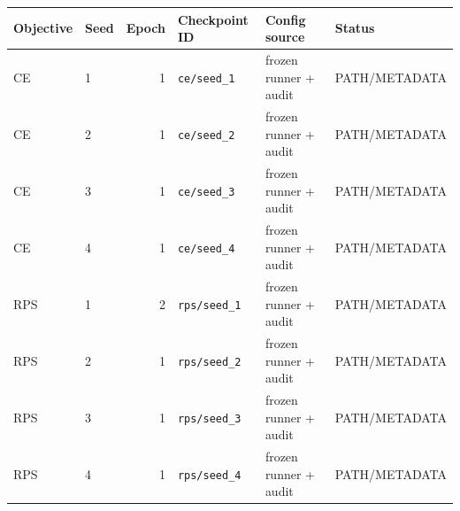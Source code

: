 \begin{center}
\footnotesize
\begin{tabular}{llrlll}
\toprule
Objective & Seed & Epoch & Checkpoint ID & Config source & Status \\
\midrule
CE & 1 & 1 & \texttt{ce/seed\_1} & frozen runner + audit & PATH/METADATA \\
CE & 2 & 1 & \texttt{ce/seed\_2} & frozen runner + audit & PATH/METADATA \\
CE & 3 & 1 & \texttt{ce/seed\_3} & frozen runner + audit & PATH/METADATA \\
CE & 4 & 1 & \texttt{ce/seed\_4} & frozen runner + audit & PATH/METADATA \\
RPS & 1 & 2 & \texttt{rps/seed\_1} & frozen runner + audit & PATH/METADATA \\
RPS & 2 & 1 & \texttt{rps/seed\_2} & frozen runner + audit & PATH/METADATA \\
RPS & 3 & 1 & \texttt{rps/seed\_3} & frozen runner + audit & PATH/METADATA \\
RPS & 4 & 1 & \texttt{rps/seed\_4} & frozen runner + audit & PATH/METADATA \\
\bottomrule
\end{tabular}
\label{tab:supp-solar-backbone-provenance}
\end{center}
